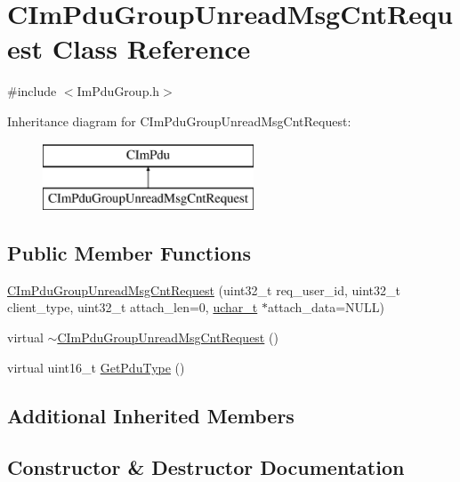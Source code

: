 \hypertarget{class_c_im_pdu_group_unread_msg_cnt_request}{}\section{C\+Im\+Pdu\+Group\+Unread\+Msg\+Cnt\+Request Class Reference}
\label{class_c_im_pdu_group_unread_msg_cnt_request}


{\ttfamily \#include $<$Im\+Pdu\+Group.\+h$>$}

Inheritance diagram for C\+Im\+Pdu\+Group\+Unread\+Msg\+Cnt\+Request\+:\begin{figure}[H]
\begin{center}
\leavevmode
\includegraphics[height=2.000000cm]{class_c_im_pdu_group_unread_msg_cnt_request}
\end{center}
\end{figure}
\subsection*{Public Member Functions}
\begin{DoxyCompactItemize}
\item 
\hyperlink{class_c_im_pdu_group_unread_msg_cnt_request_ad1d02bafa0ad970f5e6f532f6857d3cd}{C\+Im\+Pdu\+Group\+Unread\+Msg\+Cnt\+Request} (uint32\+\_\+t req\+\_\+user\+\_\+id, uint32\+\_\+t client\+\_\+type, uint32\+\_\+t attach\+\_\+len=0, \hyperlink{base_2ostype_8h_a124ea0f8f4a23a0a286b5582137f0b8d}{uchar\+\_\+t} $\ast$attach\+\_\+data=N\+U\+L\+L)
\item 
virtual \hyperlink{class_c_im_pdu_group_unread_msg_cnt_request_a01ba8129d5a54685aa9650968bfa5fa6}{$\sim$\+C\+Im\+Pdu\+Group\+Unread\+Msg\+Cnt\+Request} ()
\item 
virtual uint16\+\_\+t \hyperlink{class_c_im_pdu_group_unread_msg_cnt_request_ab99f4041b41c7331967204ab899e50a2}{Get\+Pdu\+Type} ()
\end{DoxyCompactItemize}
\subsection*{Additional Inherited Members}


\subsection{Constructor \& Destructor Documentation}
\hypertarget{class_c_im_pdu_group_unread_msg_cnt_request_ad1d02bafa0ad970f5e6f532f6857d3cd}{}
